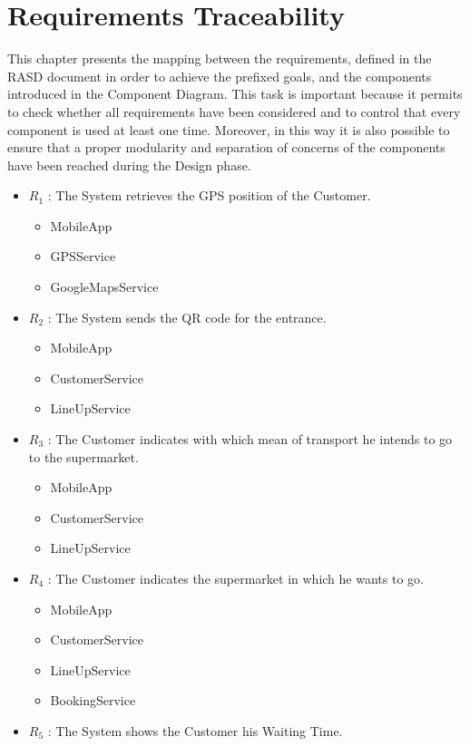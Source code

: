 \chapter{Requirements Traceability}
This chapter presents the mapping between the requirements, defined in the RASD document in order to achieve the prefixed goals, and the components introduced in the Component Diagram. This task is important because it permits to check whether all requirements have been considered and to control that every component is used at least one time. Moreover, in this way it is also possible to ensure that a proper modularity and separation of concerns of the components have been reached during the Design phase. 
\begin{itemize}
	\item $R_1$ : The System retrieves the GPS position of the Customer.
	\begin{itemize}
	\item MobileApp
	\item GPSService
	\item GoogleMapsService
	\end{itemize}
	\item $R_2$ : The System sends the QR code for the entrance.
	\begin{itemize}
	\item MobileApp 
	\item CustomerService
	\item LineUpService
	\end{itemize}
	\item $R_3$ : The Customer indicates with which mean of transport he intends to go to the supermarket.
	\begin{itemize}
	\item MobileApp
	\item CustomerService
	\item LineUpService
	\end{itemize}
	\item $R_4$ : The Customer indicates the supermarket in which he wants to go.
	\begin{itemize}
	\item MobileApp
	\item CustomerService
	\item LineUpService
	\item BookingService
	\end{itemize}
	\item $R_5$ : The System shows the Customer his Waiting Time.
	\begin{itemize}

\end{itemize}
\end{itemize}
